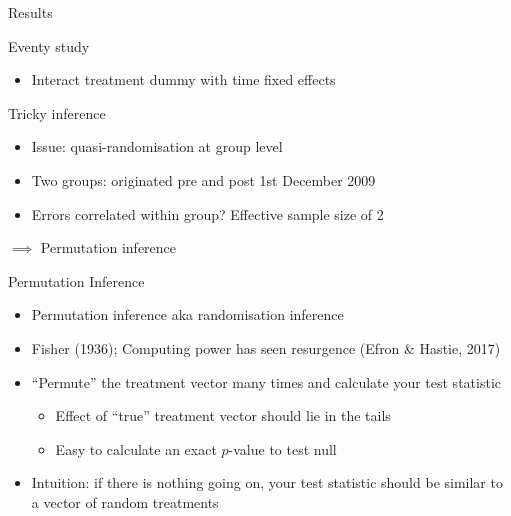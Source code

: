 \documentclass[ignorenonframetext,aspectratio=169]{beamer}
\providecommand{\tightlist}{%
  \setlength{\itemsep}{0pt}\setlength{\parskip}{0pt}}
\begin{document}
\begin{frame}{Results}

\centering

\end{frame}

\begin{frame}{Eventy study}

\begin{itemize}
\tightlist
\item
  Interact treatment dummy with time fixed effects
\end{itemize}

\footnotesize\centering

\end{frame}

\begin{frame}{Tricky inference}

\begin{itemize}
\item
  Issue: quasi-randomisation at group level
\item
  Two groups: originated pre and post 1st December 2009
\item
  Errors correlated within group? Effective sample size of 2
\end{itemize}

\(\implies\) Permutation inference

\end{frame}

\begin{frame}{Permutation Inference}

\begin{itemize}
\item
  Permutation inference aka randomisation inference
\item
  Fisher (1936); Computing power has seen resurgence (Efron \& Hastie,
  2017)
\item
  ``Permute'' the treatment vector many times and calculate your test
  statistic

  \begin{itemize}
  \tightlist
  \item
    Effect of ``true'' treatment vector should lie in the tails
  \item
    Easy to calculate an exact \(p\)-value to test null
  \end{itemize}
\item
  Intuition: if there is nothing going on, your test statistic should be
  similar to a vector of random treatments
\end{itemize}

\end{frame}
\end{document}
